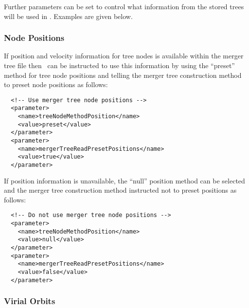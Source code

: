 Further parameters can be set to control what information from the stored trees will be used in \glc. Examples are given below.

\subsubsection{Node Positions}

If position and velocity information for tree nodes is available within the merger tree file then \glc\ can be instructed to use this information by using the ``preset'' method for tree node positions and telling the merger tree construction method to preset node positions as follows:
\begin{verbatim}
  <!-- Use merger tree node positions -->
  <parameter>
    <name>treeNodeMethodPosition</name>
    <value>preset</value>
  </parameter>
  <parameter>
    <name>mergerTreeReadPresetPositions</name>
    <value>true</value>
  </parameter>
\end{verbatim}
If position information is unavailable, the ``null'' position method can be selected and the merger tree construction method instructed not to preset positions as follows:
\begin{verbatim}
  <!-- Do not use merger tree node positions -->
  <parameter>
    <name>treeNodeMethodPosition</name>
    <value>null</value>
  </parameter>
  <parameter>
    <name>mergerTreeReadPresetPositions</name>
    <value>false</value>
  </parameter>
\end{verbatim}

\subsubsection{Virial Orbits}

